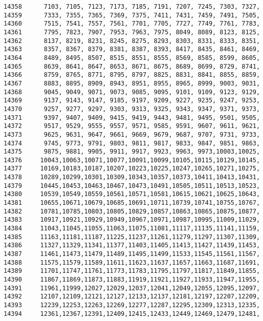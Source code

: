 \begin{Code}
\begin{verbatim}
14358      7103, 7105, 7123, 7173, 7185, 7191, 7207, 7245, 7303, 7327, 
14359      7333, 7355, 7365, 7369, 7375, 7411, 7431, 7459, 7491, 7505, 
14360      7515, 7541, 7557, 7561, 7701, 7705, 7727, 7749, 7761, 7783,
14361      7795, 7823, 7907, 7953, 7963, 7975, 8049, 8089, 8123, 8125,
14362      8137, 8219, 8231, 8245, 8275, 8293, 8303, 8331, 8333, 8351,
14363      8357, 8367, 8379, 8381, 8387, 8393, 8417, 8435, 8461, 8469,
14364      8489, 8495, 8507, 8515, 8551, 8555, 8569, 8585, 8599, 8605,
14365      8639, 8641, 8647, 8653, 8671, 8675, 8689, 8699, 8729, 8741,
14366      8759, 8765, 8771, 8795, 8797, 8825, 8831, 8841, 8855, 8859,
14367      8883, 8895, 8909, 8943, 8951, 8955, 8965, 8999, 9003, 9031,
14368      9045, 9049, 9071, 9073, 9085, 9095, 9101, 9109, 9123, 9129,
14369      9137, 9143, 9147, 9185, 9197, 9209, 9227, 9235, 9247, 9253,
14370      9257, 9277, 9297, 9303, 9313, 9325, 9343, 9347, 9371, 9373,
14371      9397, 9407, 9409, 9415, 9419, 9443, 9481, 9495, 9501, 9505,
14372      9517, 9529, 9555, 9557, 9571, 9585, 9591, 9607, 9611, 9621,
14373      9625, 9631, 9647, 9661, 9669, 9679, 9687, 9707, 9731, 9733,
14374      9745, 9773, 9791, 9803, 9811, 9817, 9833, 9847, 9851, 9863,
14375      9875, 9881, 9905, 9911, 9917, 9923, 9963, 9973,10003,10025,
14376     10043,10063,10071,10077,10091,10099,10105,10115,10129,10145,
14377     10169,10183,10187,10207,10223,10225,10247,10265,10271,10275,
14378     10289,10299,10301,10309,10343,10357,10373,10411,10413,10431,
14379     10445,10453,10463,10467,10473,10491,10505,10511,10513,10523,
14380     10539,10549,10559,10561,10571,10581,10615,10621,10625,10643,
14381     10655,10671,10679,10685,10691,10711,10739,10741,10755,10767,
14382     10781,10785,10803,10805,10829,10857,10863,10865,10875,10877,
14383     10917,10921,10929,10949,10967,10971,10987,10995,11009,11029,
14384     11043,11045,11055,11063,11075,11081,11117,11135,11141,11159,
14385     11163,11181,11187,11225,11237,11261,11279,11297,11307,11309,
14386     11327,11329,11341,11377,11403,11405,11413,11427,11439,11453,
14387     11461,11473,11479,11489,11495,11499,11533,11545,11561,11567,
14388     11575,11579,11589,11611,11623,11637,11657,11663,11687,11691,
14389     11701,11747,11761,11773,11783,11795,11797,11817,11849,11855,
14390     11867,11869,11873,11883,11919,11921,11927,11933,11947,11955,
14391     11961,11999,12027,12029,12037,12041,12049,12055,12095,12097,
14392     12107,12109,12121,12127,12133,12137,12181,12197,12207,12209,
14393     12239,12253,12263,12269,12277,12287,12295,12309,12313,12335,
14394     12361,12367,12391,12409,12415,12433,12449,12469,12479,12481,

\end{verbatim}
\end{Code}
